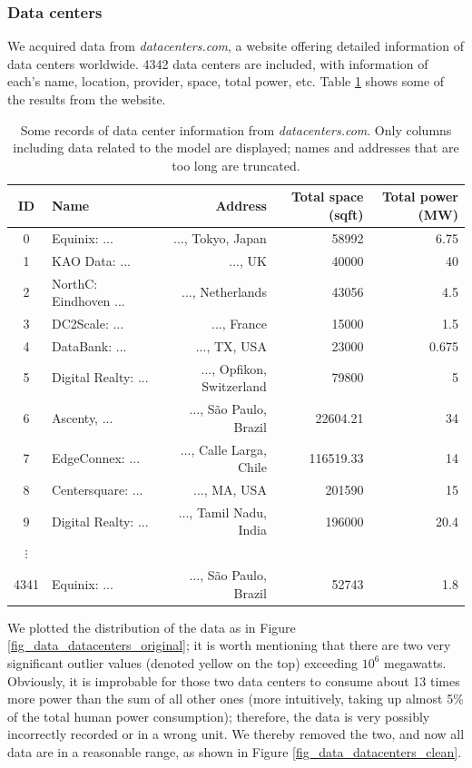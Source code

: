 \documentclass[12pt]{article}
\begin{document}
\subsubsection{Data centers}

We acquired data from \textit{datacenters.com}, a website offering detailed information of data centers worldwide. 4342 data centers \citep{datacenters_com} are included, with information of each's name, location, provider, space, total power, etc. Table \ref{table_data_datacenters.com} shows some of the results from the website.

\begin{table}[!t]
	\centering
	\caption{Some records of data center information from \textit{datacenters.com}. Only columns including data related to the model are displayed; names and addresses that are too long are truncated.}
	\label{table_data_datacenters.com}
	\small
	\begin{tabular}{clrrr}
		\hline
		\textbf{ID} & \textbf{Name} & \textbf{Address} & \textbf{Total space} (sqft) & \textbf{Total power} (MW) \\
		\hline
		0 & Equinix: ... & ..., Tokyo, Japan & 58992 & 6.75 \\
		1 & KAO Data: ... & ..., UK & 40000 & 40 \\
		2 & NorthC: Eindhoven ... & ..., Netherlands & 43056 & 4.5 \\
		3 & DC2Scale: ... & ..., France & 15000 & 1.5 \\
		4 & DataBank: ... & ..., TX, USA & 23000 & 0.675 \\
		5 & Digital Realty: ... & ..., Opfikon, Switzerland & 79800 & 5 \\
		6 & Ascenty, ... & ..., São Paulo, Brazil & 22604.21 & 34 \\
		7 & EdgeConnex: ... & ..., Calle Larga, Chile & 116519.33 & 14 \\
		8 & Centersquare: ... & ..., MA, USA & 201590 & 15 \\
		9 & Digital Realty: ... & ..., Tamil Nadu, India & 196000 & 20.4 \\
		$\vdots$ &&&& \\
		4341 & Equinix: ... & ..., São Paulo, Brazil & 52743 & 1.8 \\
		\hline
	\end{tabular}
\end{table}

We plotted the distribution of the data as in Figure \ref{fig_data_datacenters_original}; it is worth mentioning that there are two very significant outlier values (denoted yellow on the top) exceeding $10^6$ megawatts. Obviously, it is improbable for those two data centers to consume about 13 times more power than the sum of all other ones (more intuitively, taking up almost 5\% of the total human power consumption); therefore, the data is very possibly incorrectly recorded or in a wrong unit. We thereby removed the two, and now all data are in a reasonable range, as shown in Figure \ref{fig_data_datacenters_clean}.
\end{document}
